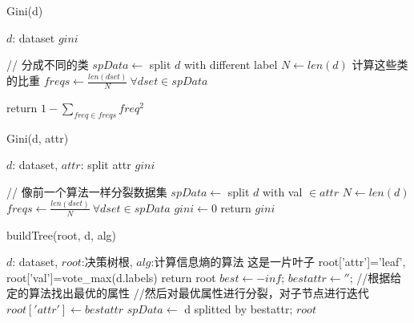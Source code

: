 \documentclass[11pt]{article}
\begin{document}
\begin{CJK}{UTF8}{gbsn}
\begin{algorithm}
\caption{Gini(d)}\label{alg8}
\begin{algorithmic}
\REQUIRE $d$: dataset
\ENSURE $gini$

\STATE // 分成不同的类
\STATE $spData \gets $ split $d$ with different label
\STATE $N \gets len(d)$
\STATE 计算这些类的比重
\STATE $freqs \gets \frac{len(dset)}{N}\ \forall dset \in spData$ \newline

\STATE return $1-\sum_{freq\in freqs}{freq^2}$
\end{algorithmic}
\end{algorithm}

\begin{algorithm}
\caption{Gini(d, attr)}\label{alg5}
\begin{algorithmic}
\REQUIRE $d$: dataset, $attr$: split attr
\ENSURE $gini$

\STATE // 像前一个算法一样分裂数据集
\STATE $spData \gets $ split $d$ with val $\in attr$
\STATE $N \gets len(d)$
\STATE $freqs \gets \frac{len(dset)}{N}\ \forall dset \in spData$ \newline
\STATE $gini \gets 0$
\ENDFOR
\STATE return $gini$
\end{algorithmic}
\end{algorithm}

\begin{algorithm}
\caption{buildTree(root, d, alg)}\label{alg6}
\begin{algorithmic}
\REQUIRE $d$: dataset, $root$:决策树根, $alg$:计算信息熵的算法
\STATE 这是一片叶子
\STATE root['attr']='leaf', root['val']=vote\_max(d.labels)
\STATE return root
\ELSE
\STATE $best \gets -inf$;
\STATE $bestattr \gets ''$;
\STATE //根据给定的算法找出最优的属性
\ENDFOR \newline
\STATE //然后对最优属性进行分裂，对子节点进行迭代
\STATE $root['attr']\gets bestattr$
\STATE $spData \gets$ d splitted by bestattr;
\ENDFOR 
\ENDIF
\ENSURE $root$

\end{algorithmic}
\end{algorithm}


\end{CJK}
\end{document}
